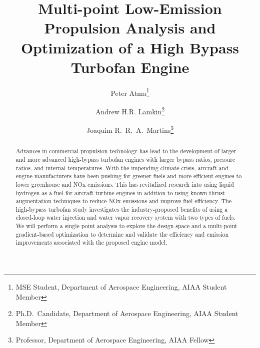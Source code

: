\documentclass[conf]{new-aiaa}
\title{Multi-point Low-Emission Propulsion Analysis and Optimization of a High Bypass Turbofan Engine} %
\author{Peter Atma\footnote{MSE Student, Department of Aerospace Engineering, AIAA Student Member}}
\author{Andrew H.R. Lamkin\footnote{Ph.D.~Candidate, Department of Aerospace Engineering, AIAA Student Member}}
\author{Joaquim R.~R.~A.~Martins\footnote{Professor, Department of Aerospace Engineering, AIAA Fellow}}
\affil{University of Michigan, Ann Arbor, MI, 48109}
\begin{document}
\maketitle

\begin{abstract}
	Advances in commercial propulsion technology has lead to the development of larger and more advanced high-bypass turbofan engines with larger bypass ratios, pressure ratios, and internal temperatures.
	With the impending climate crisis, aircraft and engine manufacturers have been pushing for greener fuels and more efficient engines to lower greenhouse and NOx emissions.
	This has revitalized research into using liquid hydrogen as a fuel for aircraft turbine engines in addition to using known thrust augmentation techniques to reduce NOx emissions and improve fuel efficiency.
	The high-bypass turbofan study investigates the industry-proposed benefits of using a closed-loop water injection and water vapor recovery system with two types of fuels.
	We will perform a single point analysis to explore the design space and a multi-point gradient-based optimization to determine and validate the efficiency and emission improvements associated with the proposed engine model.

\end{abstract}
\end{document}
